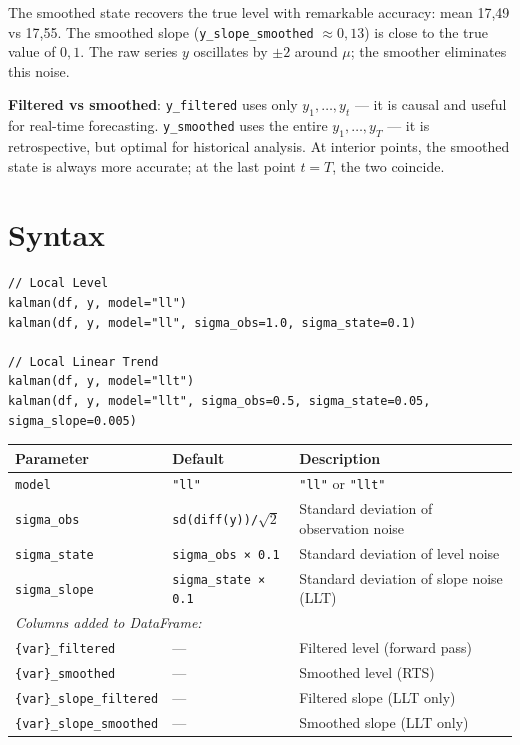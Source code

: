The smoothed state recovers the true level with remarkable accuracy: mean 17{,}49
vs 17{,}55. The smoothed slope (\texttt{y\_slope\_smoothed} $\approx
0{,}13$) is close to the true value of $0{,}1$. The raw series $y$ oscillates
by $\pm 2$ around $\mu$; the smoother eliminates this noise.

\begin{nota}
  \textbf{Filtered vs smoothed}: \texttt{y\_filtered} uses only
  $y_1, \ldots, y_t$ — it is causal and useful for real-time forecasting.
  \texttt{y\_smoothed} uses the entire $y_1, \ldots, y_T$ — it is retrospective,
  but optimal for historical analysis. At interior points, the smoothed state
  is always more accurate; at the last point $t=T$, the two coincide.
\end{nota}

\section{Syntax}

\begin{lstlisting}
// Local Level
kalman(df, y, model="ll")
kalman(df, y, model="ll", sigma_obs=1.0, sigma_state=0.1)

// Local Linear Trend
kalman(df, y, model="llt")
kalman(df, y, model="llt", sigma_obs=0.5, sigma_state=0.05, sigma_slope=0.005)
\end{lstlisting}

\begin{center}
\begin{tabular}{lll}
\toprule
\textbf{Parameter} & \textbf{Default} & \textbf{Description} \\
\midrule
\texttt{model}       & \texttt{"ll"}         & \texttt{"ll"} or \texttt{"llt"} \\
\texttt{sigma\_obs}  & \texttt{sd(diff(y))/\(\sqrt{2}\)} & Standard deviation of observation noise \\
\texttt{sigma\_state}& \texttt{sigma\_obs × 0.1}         & Standard deviation of level noise \\
\texttt{sigma\_slope}& \texttt{sigma\_state × 0.1}       & Standard deviation of slope noise (LLT) \\
\midrule
\multicolumn{3}{l}{\textit{Columns added to DataFrame:}} \\
\texttt{\{var\}\_filtered}        & — & Filtered level (forward pass) \\
\texttt{\{var\}\_smoothed}        & — & Smoothed level (RTS) \\
\texttt{\{var\}\_slope\_filtered} & — & Filtered slope (LLT only) \\
\texttt{\{var\}\_slope\_smoothed} & — & Smoothed slope (LLT only) \\
\bottomrule
\end{tabular}
\end{center}

